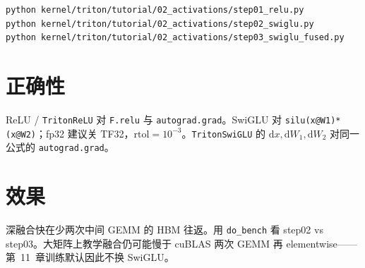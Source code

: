 \begin{runcmd}
\begin{lstlisting}[style=shell]
python kernel/triton/tutorial/02_activations/step01_relu.py
python kernel/triton/tutorial/02_activations/step02_swiglu.py
python kernel/triton/tutorial/02_activations/step03_swiglu_fused.py
\end{lstlisting}
\end{runcmd}

\section{正确性}

\begin{note}
ReLU / \texttt{TritonReLU} 对 \texttt{F.relu} 与 \texttt{autograd.grad}。SwiGLU 对 \texttt{silu(x@W1)*(x@W2)}；fp32 建议关 TF32，$\mathrm{rtol}=10^{-3}$。\texttt{TritonSwiGLU} 的 $\mathrm{d}x,\mathrm{d}W_1,\mathrm{d}W_2$ 对同一公式的 \texttt{autograd.grad}。
\end{note}

\section{效果}

\begin{remark}
深融合快在少两次中间 GEMM 的 HBM 往返。用 \texttt{do\_bench} 看 step02 vs step03。大矩阵上教学融合仍可能慢于 cuBLAS 两次 GEMM 再 elementwise——第~11~章训练默认因此不换 SwiGLU。
\end{remark}
